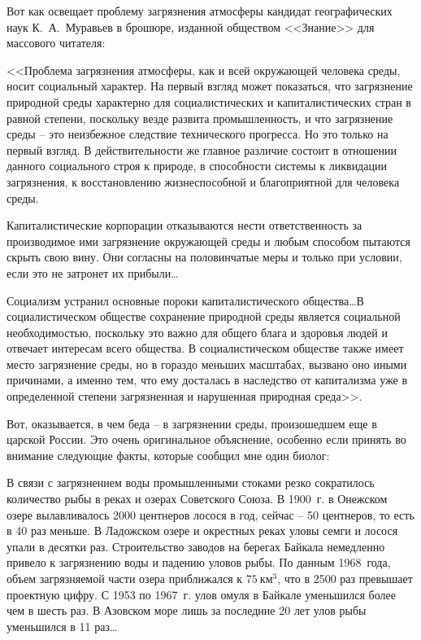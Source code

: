 \documentclass{book}
\begin{document}
Вот как освещает проблему загрязнения атмосферы кандидат географических наук К.~А.~Муравьев в брошюре, изданной обществом 
<<Знание>> для массового читателя:

<<Проблема загрязнения атмосферы, как и всей окружающей человека среды, носит социальный характер. На первый взгляд может 
показаться, что загрязнение природной среды характерно для социалистических и капиталистических стран в равной степени, 
поскольку везде развита промышленность, и что загрязнение среды -- это неизбежное следствие технического прогресса. Но это 
только на первый взгляд. В действительности же главное различие состоит в отношении данного социального строя к природе, в 
способности системы к ликвидации загрязнения, к восстановлению жизнеспособной и благоприятной для человека среды.

Капиталистические корпорации отказываются нести ответственность за производимое ими загрязнение окружающей среды и любым 
способом пытаются скрыть свою вину. Они согласны на половинчатые меры и только при условии, если это не затронет их 
прибыли\ldots

Социализм устранил основные пороки капиталистического общества\ldots В социалистическом обществе сохранение природной среды 
является социальной необходимостью, поскольку это важно для общего блага и здоровья людей и отвечает инте­ресам всего общества. В 
социалистическом обществе также имеет место загрязнение среды, но в гораздо меньших масштабах, вызвано оно иными причинами, а 
именно тем, что ему досталась в наследство от капитализма уже в определенной степени загрязненная и нарушенная природная 
среда>>.%

Вот, оказывается, в чем беда -- в загрязнении среды, прои­зошедшем еще в царской России. Это очень оригинальное объяснение, 
особенно если принять во внимание следующие факты, которые сообщил мне один биолог:

В связи с загрязнением воды промышленными стоками резко сократилось количество рыбы в реках и озерах Советского Союза. В 1900~г. 
в Онежском озере вылавливалось 2000 центнеров лосося в год, сейчас -- 50 центнеров, то есть в 40 раз меньше. В Ладожском озере и 
окрестных реках уловы семги и лосося упали в десятки раз. Строительство заводов на берегах Байкала немедленно привело к 
загрязнению воды и падению уловов рыбы. По данным 1968~года, объем загрязняемой части озера приближался к $75~\text{км}^3$, что в 2500 раз 
превышает проектную цифру. С 1953 по 1967~г. улов омуля в Байкале уменьшился более чем в шесть раз. В Азовском море лишь за 
последние 20 лет улов рыбы уменьшился в 11 раз\ldots
\end{document}
